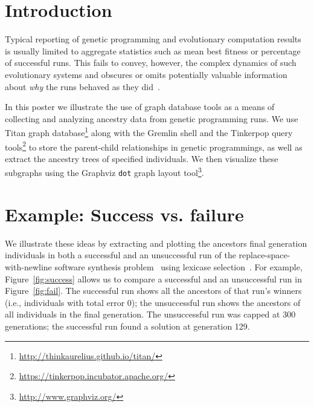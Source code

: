 \documentclass{sig-alternate}
\begin{document}
\section{Introduction}
\label{sec:introduction}

Typical reporting of genetic programming and evolutionary computation results is usually limited to aggregate statistics such as mean best fitness or percentage of successful runs. This fails to convey, however, the complex dynamics of such evolutionary systems and obscures or omits potentially valuable information about \emph{why} the runs behaved as they did~\cite{McPhee:2015:GPTP}.

In this poster we illustrate the use of graph database tools as a means of collecting and analyzing ancestry data from genetic programming runs. We use Titan graph database\footnote{\url{http://thinkaurelius.github.io/titan/}} along with the Gremlin shell and the Tinkerpop query tools\footnote{\url{https://tinkerpop.incubator.apache.org/}} to store the parent-child relationships in genetic programmings, as well as extract the ancestry trees of specified individuals. We then visualize these subgraphs using the Graphviz \texttt{dot} graph layout tool\footnote{\url{http://www.graphviz.org/}}.

\section{Example: Success vs. failure}
\label{sec:examples}

We  illustrate these ideas by extracting and plotting the ancestors final generation individuals in both a successful and an unsuccessful run of the replace-space-with-newline software synthesis problem~\cite{Helmuth:2015:GECCO,Helmuth:2015:dissertation} using lexicase selection~\cite{Helmuth:2014:ieeeTEC}. For example, Figure~\ref{fig:success} allows us to compare a successful and an unsuccessful run in Figure~\ref{fig:fail}. The successful run shows all the ancestors of that run's winners (i.e., individuals with total error 0); the unsuccessful run shows the ancestors of all individuals in the final generation. The unsuccessful run was capped at 300 generations; the successful run found a solution at generation 129.
\end{document}
